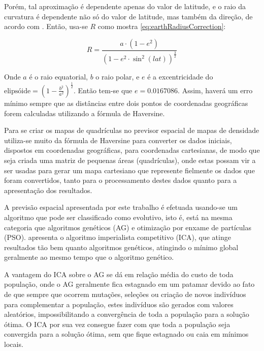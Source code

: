 Porém, tal aproximação é dependente apenas do valor de latitude, e o raio da curvatura é dependente não só do valor de latitude, mas também da direção, de acordo com \cite{snyder1987map}. Então, usa-se \(R\) como mostra \ref{eq:earthRadiusCorrection}:

\begin{equation}
\label{eq:earthRadiusCorrection}
R = \frac{ a \cdot (1 - e^2)}{ (1 - e^2 \cdot \sin^2(lat))^\frac{3}{2}}
\end{equation}

Onde \(a\) é o raio equatorial, \(b\) o raio polar, e \(e\) é a excentricidade do 
\(\text{elipsóide} = \left(1 - \frac{b^2}{a^2}\right)^\frac{1}{2}\). 
Então tem-se que \(e = 0.0167086\). Assim, haverá um erro mínimo sempre que as distâncias entre dois pontos de coordenadas geográficas forem calculadas utilizando a fórmula de Haversine.

Para se criar os mapas de quadrículas no previsor espacial de mapas de densidade utiliza-se muito da fórmula de Haversine para converter os dados iniciais, dispostos em coordenadas geográficas, para coordenadas cartesianas, de modo que seja criada uma matriz de pequenas áreas (quadrículas), onde estas possam vir a ser usadas para gerar um mapa cartesiano que represente fielmente os dados que foram convertidos, tanto para o processamento destes dados quanto para a apresentação dos resultados.

A previsão espacial apresentada por este trabalho é efetuada usando-se um algoritmo que pode ser classificado como evolutivo, isto é, está na mesma categoria que  algoritmos genéticos (AG) \cite{mitchell1998introduction} e otimização por enxame de partículas (PSO). \cite{atashpaz2007imperialist} apresenta o algoritmo imperialista competitivo (ICA), que atinge resultados tão bem quanto algoritmos genéticos, atingindo o mínimo global geralmente ao mesmo tempo que o algoritmo genético. 

A vantagem do ICA sobre o AG se dá em relação média do custo de toda população, onde o AG geralmente fica estagnado em um patamar devido ao fato de que sempre que ocorrem mutações, seleções ou criação de novos indivíduos para complementar a população, estes indivíduos são gerados com valores aleatórios, impossibilitando a convergência de toda a população para a solução ótima. O ICA por sua vez consegue fazer com que toda a população seja convergida para a solução ótima, sem que fique estagnado ou caia em mínimos locais.  

